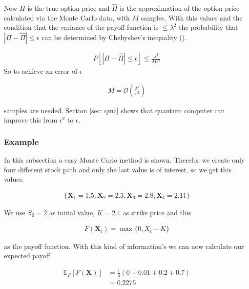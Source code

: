 \documentclass[../../main.tex]{subfiles}
\begin{document}
Now $\Pi$ is the true option price and $\hat{\Pi}$ is the approximation of the option price calculated via the Monte Carlo data, with $M$ samples. With this values and the condition that the variance of the payoff function is $ \leq \lambda^2$ the probability that $|\Pi-\hat{\Pi}| \leq \epsilon$ can be determined by Chebyshev’s inequality (\cite{1504.06987}).

\begin{align}
	        P[|\Pi-\hat{\Pi}| \leq \epsilon] \leq \frac{\lambda^2}{M\epsilon^2}
	    \end{align}
So to achieve an error of $\epsilon$

\begin{align}
	        M=\mathcal{O}(\frac{\lambda^2}{\epsilon^2}) \label{eq:classic_M}
\end{align}

samples are needed. Section \ref{sec: qmc} shows that quantum computer can improve this from $\epsilon^2$ to $\epsilon$.

\subsubsection{Example} \label{seq:MC_example}
In this subsection a easy Monte Carlo method is shown. Therefor we create only four different stock path and only the last value is of interest, so we get this values:

\begin{align}
    \{\textbf{X}_1=1.5, \textbf{X}_2=2.3, \textbf{X}_3=2.8, \textbf{X}_4=2.11\} \nonumber
\end{align}

We use $S_0=2$ as initial value, $K=2.1$ as strike price and this

\begin{align}
    F(\textbf{X}_i) = \max\{0, X_i - K\} \label{eq:MC_example_european}
\end{align}

as the payoff function. With this kind of information's we can now calculate our expected payoff

\begin{align}
    \mathbb{E}_P[F(\textbf{X})] &= \frac{1}{4}(0+0.01+0.2+0.7 ) \nonumber \\
    &= 0.2275 \nonumber
\end{align}

\biblio
\end{document}
